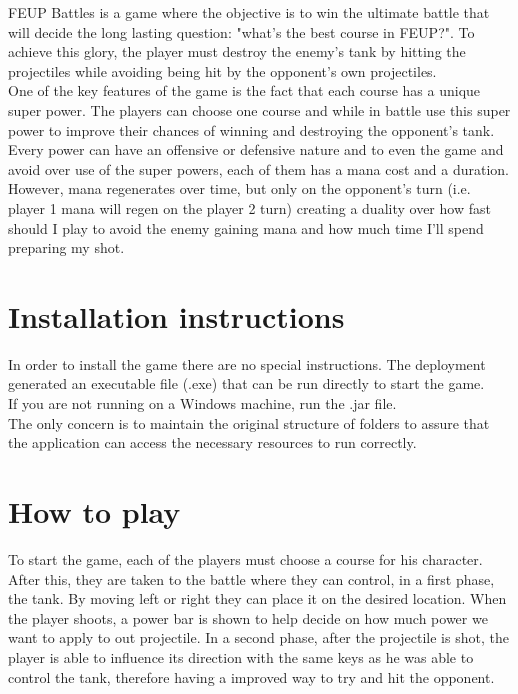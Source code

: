 \documentclass[11pt,a4paper]{report}
\begin{document}
FEUP Battles is a game where the objective is to win the ultimate battle that will decide the long lasting question: "what's the best course in FEUP?". 
To achieve this glory, the player must destroy the enemy's tank by hitting the projectiles while avoiding being hit by the opponent's own projectiles. \\

One of the key features of the game is the fact that each course has a unique super power. The players can choose one course and while in battle use this super power to improve their chances of winning and destroying the opponent's tank. Every power can have an offensive or defensive nature and to even the game and avoid over use of the super powers, each of them has a mana cost and a duration. \\

However, mana regenerates over time, but only on the opponent's turn (i.e. player 1 mana will regen on the player 2 turn) creating a duality over how fast should I play to avoid the enemy gaining mana and how much time I'll spend preparing my shot.

\chapter{Installation instructions}

In order to install the game there are no special instructions. The deployment generated an executable file (.exe) that can be run directly to start the game. \\

If you are not running on a Windows machine, run the .jar file.\\

The only concern is to maintain the original structure of folders to assure that the application can access the necessary resources to run correctly.

\chapter{How to play}

To start the game, each of the players must choose a course for his character. After this, they are taken to the battle where they can control, in a first phase, the tank. By moving left or right they can place it on the desired location. When the player shoots, a power bar is shown to help decide on how much power we want to apply to out projectile. In a second phase, after the projectile is shot, the player is able to influence its direction with the same keys as he was able to control the tank, therefore having a improved way to try and hit the opponent. \\
\end{document}
